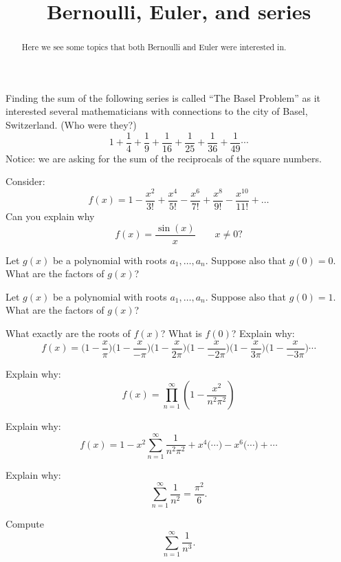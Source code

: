 \documentclass[nooutcomes]{ximera}
\title{Bernoulli, Euler, and series}
\begin{document}
\begin{abstract}
Here we see some topics that both Bernoulli and Euler were interested in.
\end{abstract}
\maketitle



Finding the sum of the following series is called ``The Basel Problem'' as it interested several mathematicians with connections to the city of Basel, Switzerland.  (Who were they?)
\[
1 + \frac{1}{4} + \frac{1}{9} + \frac{1}{16} + \frac{1}{25} + \frac{1}{36} + \frac{1}{49}\cdots
\]
Notice: we are asking for the sum of the reciprocals of the square numbers. 


\begin{question}
Consider:
\[
f(x) = 1 - \frac{x^2}{3!} + \frac{x^4}{5!}-\frac{x^6}{7!} + \frac{x^8}{9!} - \frac{x^{10}}{11!} + \dots
\]
Can you explain why 
\[
f(x) = \frac{\sin(x)}{x}\qquad x \ne 0?
\]
\end{question}


\begin{question}
Let $g(x)$ be a polynomial with roots $a_1,\dots, a_n$. Suppose also
that $g(0)=0$. What are the factors of $g(x)$?
\end{question}

\begin{question}
Let $g(x)$ be a polynomial with roots $a_1,\dots, a_n$. Suppose also
that $g(0)=1$. What are the factors of $g(x)$?
\end{question}

\begin{question}
What exactly are the roots of $f(x)$? What is $f(0)$?  Explain why:
\[
f(x) = \bigg(1-\frac{x}{\pi} \bigg)\bigg(1-\frac{x}{-\pi} \bigg)\bigg(1-\frac{x}{2\pi} \bigg)\bigg(1-\frac{x}{-2\pi} \bigg)\bigg(1-\frac{x}{3\pi} \bigg)\bigg(1-\frac{x}{-3\pi} \bigg) \cdots
\]
\end{question}

\begin{question}
Explain why:
\[
f(x) = \prod_{n=1}^\infty \left(1 - \frac{x^2}{n^2\pi^2} \right)
\]
\end{question}

\begin{question}
Explain why:
\[
f(x) = 1 - x^2 \sum_{n=1}^\infty \frac{1}{n^2\pi^2} 
+ x^4 \bigg(\cdots\bigg)  - x^6 \bigg(\cdots\bigg)  + \cdots
\]
\end{question}


\begin{question}
Explain why:
\[
\sum_{n=1}^\infty \frac{1}{n^2}= \frac{\pi^2}{6}.
\]
\end{question}

\begin{exploration}[Bonus!]
Compute
\[
\sum_{n=1}^\infty \frac{1}{n^3}.
\]
\end{exploration}
\end{document}
